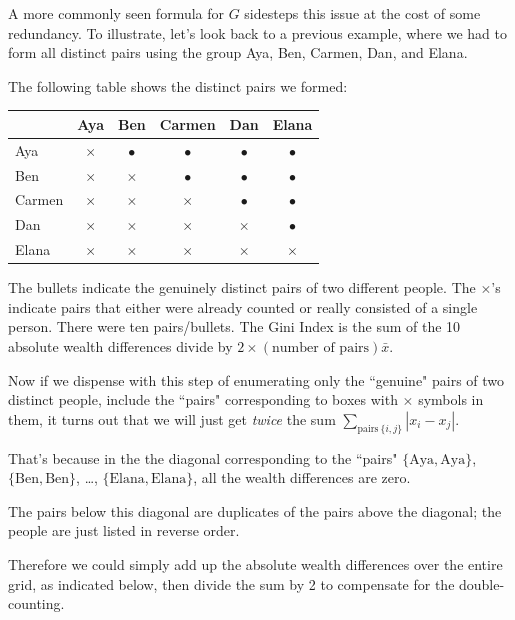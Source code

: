 \documentclass[12pt]{memoir}\usepackage[]{graphicx}\usepackage[table]{xcolor}
\begin{document}
A more commonly seen formula for $G$ sidesteps this issue at the cost of some
redundancy. To illustrate, let's look back to a previous example, where 
we had to form all distinct pairs using the group Aya, Ben, Carmen, Dan, and Elana.

The following table shows the distinct pairs we formed: 

\begin{center}
\begin{tabular}{|l|c|c|c|c|c|}
\toprule
     & Aya & Ben & Carmen & Dan & Elana \\ \midrule 
Aya    & $\times$ & $\bullet$  &  $\bullet$ & $\bullet$ & $\bullet$ \\ \midrule
Ben    & $\times$  & $\times$  & $\bullet$  & $\bullet$ & $\bullet$   \\ \midrule 
Carmen & $\times$  &  $\times$    &   $\times$      & $\bullet$ & $\bullet$ \\ \midrule
Dan    & $\times$  &  $\times$    &   $\times$      &  $\times$    & $\bullet$ \\ \midrule
Elana  & $\times$   &  $\times$    &  $\times$       &  $\times$    &  $\times$     \\ \bottomrule
\end{tabular}
\end{center}

The bullets indicate the genuinely distinct pairs of two different people.  
The $\times$'s indicate pairs that either were already counted or really
consisted of a single person.  There were ten pairs/bullets.  The Gini
Index is the sum of the 10 absolute wealth differences divide by 
$2\times(\text{number of pairs})\bar{x}$.  

Now if we dispense with this step of enumerating only the ``genuine" pairs 
of two distinct people, include the ``pairs" corresponding to boxes with 
$\times$ symbols in them, it turns out that we will just get \emph{twice}
the sum $\displaystyle\sum_{\text{pairs}\ \{i, j\}} |x_i - x_j|$. 

That's because in the the diagonal corresponding to the ``pairs" $\{\text{Aya}, \text{Aya}\}$,
$\{\text{Ben}, \text{Ben}\}$, \ldots, $\{\text{Elana}, \text{Elana}\}$, all the 
wealth differences are zero.

The pairs below this diagonal are duplicates of the pairs above the diagonal; the people
are just listed in reverse order.  

Therefore we could simply add up the absolute wealth differences over the entire grid,
as indicated below, then divide the sum by 2 to compensate for the double-counting. 
\end{document}
